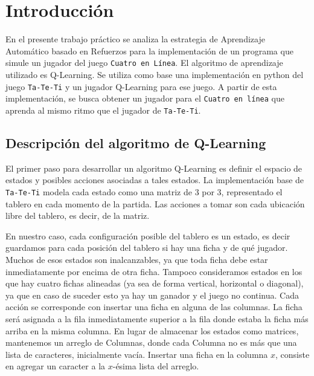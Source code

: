 \documentclass[10pt, a4paper]{article}
\begin{document}
\fecha{\today}


\maketitle
\tableofcontents
\newpage


\section{Introducción}


En el presente trabajo práctico se analiza la estrategia de Aprendizaje Automático basado en Refuerzos para la implementación de un programa que simule un jugador del juego \texttt{Cuatro en Línea}. El algoritmo de aprendizaje utilizado es Q-Learning. Se utiliza como base una implementación en python del juego \texttt{Ta-Te-Ti} y un jugador Q-Learning para ese juego. A partir de esta implementación, se busca obtener un jugador para el \texttt{Cuatro en línea} que aprenda al mismo ritmo que el jugador de \texttt{Ta-Te-Ti}.


\subsection{Descripción del algoritmo de Q-Learning}


El primer paso para desarrollar un algoritmo Q-Learning es definir el espacio de estados y posibles acciones asociadas a tales estados. La implementación base de \texttt{Ta-Te-Ti} modela cada estado como una matriz de 3 por 3, representado el tablero en cada momento de la partida. Las acciones a tomar son cada ubicación libre del tablero, es decir, de la matriz.


En nuestro caso, cada configuración posible del tablero es un estado, es decir guardamos para cada posición del tablero si hay una ficha y de qué jugador. Muchos de esos estados son inalcanzables, ya que toda ficha debe estar inmediatamente por encima de otra ficha. Tampoco consideramos estados en los que hay cuatro fichas alineadas (ya sea de forma vertical, horizontal o diagonal), ya que en caso de suceder esto ya hay un ganador y el juego no continua.
Cada acción se corresponde con insertar una ficha en alguna de las columnas. La ficha será asignada a la fila inmediatamente superior a la fila donde estaba la ficha más arriba en la misma columna. En lugar de almacenar los estados como matrices, mantenemos un arreglo de Columnas, donde cada Columna no es más que una lista de caracteres, inicialmente vacía. Insertar una ficha en la columna $x$, consiste en agregar un caracter a la $x$-ésima lista del arreglo.
\end{document}
